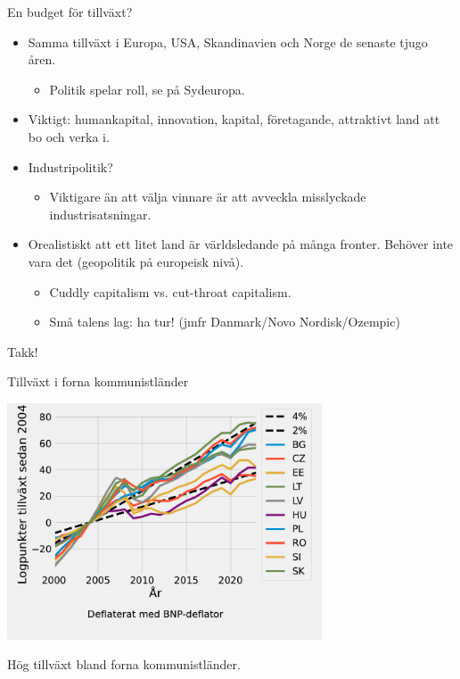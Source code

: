 \documentclass{beamer}
\begin{document}
\begin{frame}{En budget för tillväxt?}
    
    \begin{itemize}
        \item Samma tillväxt i Europa, USA, Skandinavien och Norge de senaste tjugo åren.
        \begin{itemize}
            \item Politik spelar roll, se på Sydeuropa.
        \end{itemize}
        \item Viktigt: humankapital, innovation, kapital, företagande, attraktivt land att bo och verka i.
        \item Industripolitik?
        \begin{itemize}
            \item Viktigare än att välja vinnare är att avveckla misslyckade industrisatsningar.
        \end{itemize}
        \item Orealistiskt att ett litet land är världsledande på många fronter. Behöver inte vara det (geopolitik på europeisk nivå).
        \begin{itemize}
            \item Cuddly capitalism vs. cut-throat capitalism.
            \item Små talens lag: ha tur! (jmfr Danmark/Novo Nordisk/Ozempic)
        \end{itemize}
    \end{itemize}

\end{frame}

\begin{frame}
\Huge
\vfill
\begin{center}
    Takk!
\end{center}
\vfill
\end{frame}

\begin{frame}{Tillväxt i forna kommunistländer}
    \label{communist}
    \begin{center}
            \includegraphics[width=0.7\textwidth]{figures/GDP_growth0_Europe_former_communist.pdf}
    \end{center}

    \bigskip
    \footnotesize
    Hög tillväxt bland forna kommunistländer.
    \hyperlink{eu_growth}{}
\end{frame}
\end{document}
